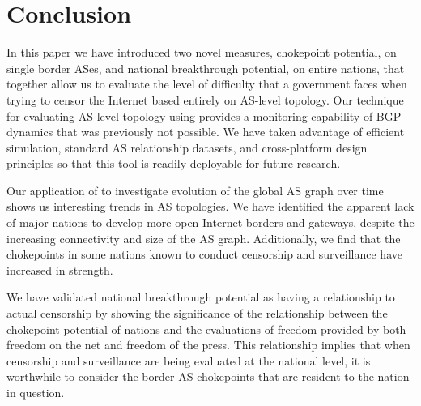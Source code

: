 \section{Conclusion}
In this paper we have introduced two novel measures, chokepoint potential, on single border ASes,
and national breakthrough potential, on entire nations, that together allow us to
evaluate the level of difficulty that a government faces when trying to censor the Internet
based entirely on AS-level topology. Our technique for evaluating AS-level topology using
\toolname{} provides a monitoring capability of BGP dynamics that was previously not possible.
We have taken advantage of efficient simulation, standard AS relationship datasets, and cross-platform
design principles so that this tool is readily deployable for future research.
\par
Our application of \toolname{} to investigate evolution of the global AS graph over time shows us
interesting trends in AS topologies. We have identified the apparent lack of major nations to develop
more open Internet borders and gateways, despite the increasing connectivity and size of the AS graph. Additionally,
we find that the chokepoints in some nations known to conduct censorship and surveillance have increased in strength.
\par
We have validated national breakthrough potential as having a relationship to actual censorship by showing
the significance of the relationship between the chokepoint potential of nations and the evaluations of freedom provided
by both freedom on the net and freedom of the press. This relationship implies that when censorship and surveillance are being evaluated
at the national level, it is worthwhile to consider the border AS chokepoints that are resident to the nation in question.